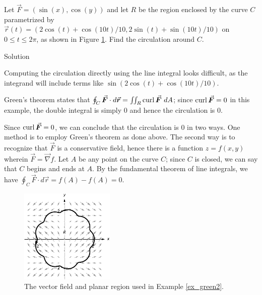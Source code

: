 \begin{example}
\label{ex_green2}
Let $\vec F = \left( \sin (x),\cos (y) \right)$ and let $R$ be the region enclosed by the curve $C$ parametrized by \\ $\vec r(t) = \left( 2\cos (t)+ \cos(10t)/10,2\sin (t)+\sin(10t)/10\right)$ on $0\leq t\leq 2\pi$, as shown in Figure \ref{fig_Vector_Calc_15}. Find the circulation around $C$.






Solution 


Computing the circulation directly using the line integral looks difficult, as the integrand will include terms like $\sin \left(2\cos (t) + \cos(10t)/10\right)$.

Green's theorem states that $\oint_C\vec F\cdot d\vec r = \iint_R \curl\vec F\ dA$; since $\curl \vec F = 0$ in this example, the double integral is simply 0 and hence the circulation is 0.

Since $\curl \vec F = 0$, we can conclude that the circulation is 0 in two ways. One method is to employ Green's theorem as done above. The second way is to recognize that $\vec F$ is a conservative field, hence there is a function $z=f(x,y)$ wherein $\vec F = \vec{\nabla} f$. Let $A$ be any point on the curve $C$; since $C$ is closed, we can say that $C$ begins and ends at $A$. By the fundamental theorem of line integrals, we have $\oint_C \vec F\cdot d\vec r = f(A)-f(A) = 0$.


\begin{figure}[H]
	\begin{center}
			\includegraphics[width=0.4\textwidth]{fig_Vector_Calc_15}
	\caption{The vector field and planar region used in Example \ref{ex_green2}.}
	\label{fig_Vector_Calc_15}
	\end{center}
\end{figure}
\end{example}

